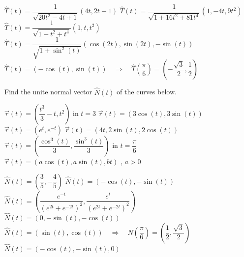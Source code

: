 \begin{Answer}
    
         \Question $\widehat T(t) = \dfrac{1}{\sqrt{20t^2-4t+1}} \left(4t, 2t-1\right)$ 
         \Question $\widehat T(t) = \dfrac{1}{\sqrt{1+16t^2+81t^4}}\left(1, -4t, 9t^2 \right)$  
         \Question $\widehat T(t) = \dfrac{1}{\sqrt{1+t^2+t^4}}\left(1, t, t^2 \right)$ 
         \Question $\widehat T(t) = \dfrac{1}{\sqrt{1+\sin^2 (t)}}\left(\cos (2t), \sin (2t), -\sin (t) \right)$ 
        \Question $\widehat T(t)  =\left(-\cos(t), \sin(t) \right) \quad \Rightarrow \quad \widehat T\left(\dfrac{\pi}{6} \right)= \left(-\dfrac{\sqrt{3}}{2}, \dfrac{1}{2} \right)$
     
\end{Answer}
     
\begin{Exercise} Find the unite normal vector $\widehat N(t)$ of the curves below. 
     \begin{multicols}{2}
       \Question[difficulty=1] $\vec r(t) = \left(\dfrac{t^3}{3} - t, t^2 \right)$ \qquad in \quad $t=3$ 
       \Question[difficulty=1] $\vec r(t) = \left(3 \cos(t), 3 \sin(t) \right)$ 
       \ifanalysis\Question[difficulty=2]\fi\ifcalculus\Question[difficulty=3]\fi  $\vec r(t) = \left(e^t, e^{-t} \right)$ 
       \Question[difficulty=2] $\vec r(t) = \left(4t, 2 \sin(t), 2 \cos(t) \right)$ 
       \ifanalysis\Question[difficulty=2]\fi\ifcalculus\Question[difficulty=3]\fi  $\vec r(t) = \left(\dfrac{\cos^3(t)}{3}, \dfrac{\sin^3(t)}{3}\right)$ \quad in \; $t=\dfrac{\pi}{6}$ 
       \ifanalysis
       \Question[difficulty=2] $\vec r(t) = \left(a \cos(t), a \sin(t), bt \right)$ , \quad $a>0$ 
       \fi
       \EndCurrentQuestion
   \end{multicols}
\end{Exercise}

\begin{Answer}
    
        \Question $\widehat N(t) = \left(\dfrac{3}{5}, -\dfrac{4}{5}\right)$
        \Question $\widehat N(t) = \left(- \cos(t), - \sin(t) \right)$
        \Question $\widehat N(t) = \left(\dfrac{e^{-t}}{\left(e^{2t} +e^{-2t}\right)^2 } , \dfrac{e^{t}}{\left(e^{2t} +e^{-2t}\right)^2 }\right)$
        \Question $\widehat N(t) = \left(0, -\sin(t), - \cos(t) \right)$
        \Question $\widehat N(t) = \left(\sin(t), \cos(t) \right) \quad \Rightarrow \quad \widehat N\left(\dfrac{\pi}{6} \right)=  \left(\dfrac{1}{2} , \dfrac{\sqrt{3}}{2} \right) $
        \ifanalysis
        \Question $\widehat N(t) = (-\cos(t),-\sin(t),0)$
        \fi
    
\end{Answer}

